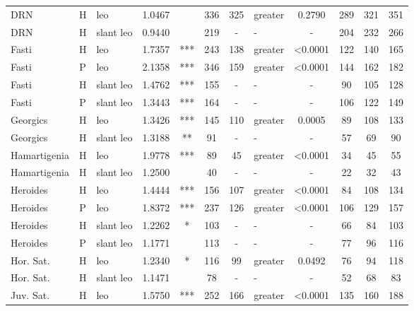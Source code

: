 \documentclass[twocolumn, switch]{article} %
\begin{document}
\begin{table}[h!]
\begin{tabular}{lclcccclcc@{\hspace{1\tabcolsep}}c@{\hspace{1\tabcolsep}}c}
           DRN &     H &        leo & 1.0467 &       &  336 &       325 &     greater & 0.2790 &  289 &  321 &  351 \\
           DRN &     H &  slant leo & 0.9440 &       &  219 &         - &        - & - &  204 &  232 &  266 \\
         Fasti &     H &        leo & 1.7357 &   *** &  243 &       138 &     greater & <0.0001 &  122 &  140 &  165 \\
         Fasti &     P &        leo & 2.1358 &   *** &  346 &       159 &     greater & <0.0001 &  144 &  162 &  182 \\
         Fasti &     H &  slant leo & 1.4762 &   *** &  155 &         - &        - & - &   90 &  105 &  128 \\
         Fasti &     P &  slant leo & 1.3443 &   *** &  164 &         - &        - & - &  106 &  122 &  149 \\
      Georgics &     H &        leo & 1.3426 &   *** &  145 &       110 &     greater & 0.0005 &   89 &  108 &  133 \\
      Georgics &     H &  slant leo & 1.3188 &    ** &   91 &         - &        - & - &   57 &   69 &   90 \\
  Hamartigenia &     H &        leo & 1.9778 &   *** &   89 &        45 &     greater & <0.0001 &   34 &   45 &   55 \\
  Hamartigenia &     H &  slant leo & 1.2500 &       &   40 &         - &        - & - &   22 &   32 &   43 \\
      Heroides &     H &        leo & 1.4444 &   *** &  156 &       107 &     greater & <0.0001 &   84 &  108 &  134 \\
      Heroides &     P &        leo & 1.8372 &   *** &  237 &       126 &     greater & <0.0001 &  106 &  129 &  157 \\
      Heroides &     H &  slant leo & 1.2262 &     * &  103 &         - &        - & - &   66 &   84 &  103 \\
      Heroides &     P &  slant leo & 1.1771 &       &  113 &         - &        - & - &   77 &   96 &  116 \\
     Hor. Sat. &     H &        leo & 1.2340 &     * &  116 &        99 &     greater & 0.0492 &   76 &   94 &  118 \\
     Hor. Sat. &     H &  slant leo & 1.1471 &       &   78 &         - &        - & - &   52 &   68 &   83 \\
     Juv. Sat. &     H &        leo & 1.5750 &   *** &  252 &       166 &     greater & <0.0001 &  135 &  160 &  188 \\

\end{tabular}
\end{table}
\end{document}

